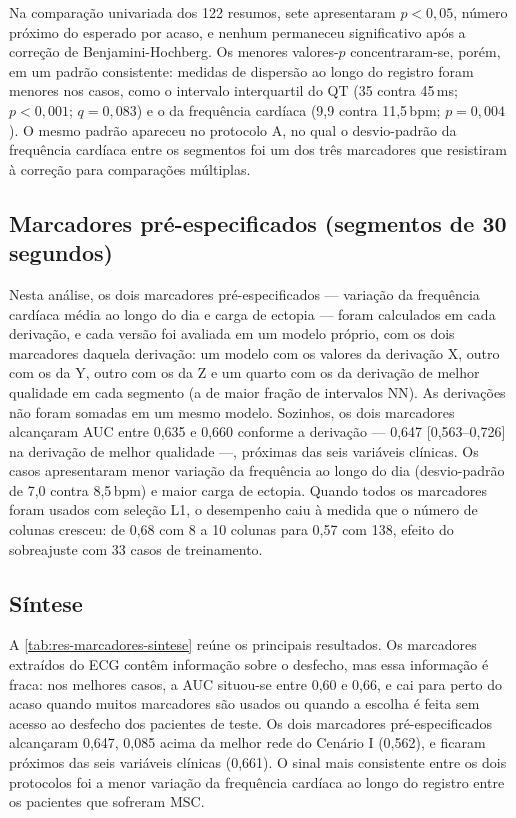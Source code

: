 Na comparação univariada dos 122 resumos, sete apresentaram $p < 0{,}05$,
número próximo do esperado por acaso, e nenhum permaneceu significativo após
a correção de Benjamini-Hochberg. Os menores valores-$p$ concentraram-se,
porém, em um padrão consistente: medidas de dispersão ao longo do registro
foram menores nos casos, como o intervalo interquartil do QT (35 contra
45\,ms; $p < 0{,}001$; $q = 0{,}083$) e o da frequência cardíaca (9,9
contra 11,5\,bpm; $p = 0{,}004$). O mesmo padrão apareceu no protocolo A,
no qual o desvio-padrão da frequência cardíaca entre os segmentos foi um dos
três marcadores que resistiram à correção para comparações múltiplas.

\subsection{Marcadores pré-especificados (segmentos de 30 segundos)}
\label{subsec:res-pre-especificados}

Nesta análise, os dois marcadores pré-especificados --- variação da
frequência cardíaca média ao longo do dia e carga de ectopia --- foram
calculados em cada derivação, e cada versão foi avaliada em um modelo
próprio, com os dois marcadores daquela derivação: um modelo com os valores
da derivação X, outro com os da Y, outro com os da Z e um quarto com os da
derivação de melhor qualidade em cada segmento (a de maior fração de
intervalos \gls{NN}). As derivações não foram somadas em um mesmo modelo.
Sozinhos, os dois marcadores alcançaram \gls{AUC} entre 0,635 e 0,660
conforme a derivação --- 0,647 [0,563--0,726] na derivação de melhor
qualidade ---, próximas das seis variáveis
clínicas. Os casos apresentaram
menor variação da frequência ao longo do dia (desvio-padrão de 7,0 contra
8,5\,bpm) e maior carga de ectopia. Quando todos os marcadores foram usados com
seleção L1, o desempenho caiu à medida que o número de colunas cresceu: de
0,68 com 8 a 10 colunas para 0,57 com 138, efeito do sobreajuste com 33 casos
de treinamento.


\subsection{Síntese}
\label{subsec:res-marcadores-sintese}

A \autoref{tab:res-marcadores-sintese} reúne os principais resultados. Os
marcadores extraídos do \gls{ECG} contêm informação sobre o desfecho, mas
essa informação é fraca: nos melhores casos, a \gls{AUC} situou-se entre 0,60
e 0,66, e cai para perto do acaso quando muitos marcadores são usados ou
quando a escolha é feita sem acesso ao desfecho dos pacientes de teste. Os
dois marcadores pré-especificados alcançaram 0,647, 0,085 acima da melhor
rede do Cenário I (0,562), e ficaram próximos das seis variáveis clínicas
(0,661). O sinal mais consistente entre os dois
protocolos foi a menor variação da frequência cardíaca ao longo do registro
entre os pacientes que sofreram \gls{MSC}.

